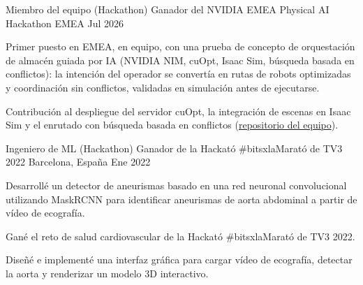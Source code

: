 \begin{cventries}

\cventry
{Miembro del equipo (Hackathon)}
{Ganador del NVIDIA EMEA Physical AI Hackathon}
{EMEA}
{Jul 2026}
{
\begin{cvitems}
\item{Primer puesto en EMEA, en equipo, con una prueba de concepto de orquestación de almacén guiada por IA (NVIDIA NIM, cuOpt, Isaac Sim, búsqueda basada en conflictos): la intención del operador se convertía en rutas de robots optimizadas y coordinación sin conflictos, validadas en simulación antes de ejecutarse.}
\item{Contribución al despliegue del servidor cuOpt, la integración de escenas en Isaac Sim y el enrutado con búsqueda basada en conflictos (\href{https://github.com/Wess2s/team_D_pai}{repositorio del equipo}).}
\end{cvitems}
}

\vspace{3mm}
\cventry
{Ingeniero de ML (Hackathon)}
{Ganador de la Hackató \#bitsxlaMarató de TV3 2022}
{Barcelona, España}
{Ene 2022}
{
\begin{cvitems}
\item{Desarrollé un detector de aneurismas basado en una red neuronal convolucional utilizando MaskRCNN para identificar aneurismas de aorta abdominal a partir de vídeo de ecografía.}
\item{Gané el reto de salud cardiovascular de la Hackató \#bitsxlaMarató de TV3 2022.}
\item{Diseñé e implementé una interfaz gráfica para cargar vídeo de ecografía, detectar la aorta y renderizar un modelo 3D interactivo.}
\end{cvitems}
}

\end{cventries}
